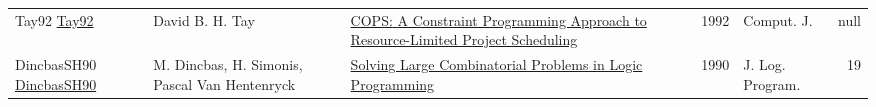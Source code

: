 {\begin{longtable}{p{3cm}p{6cm}p{7cm}rrrp{3cm}r}
Tay92 \href{}{Tay92} & David B. H. Tay & \href{}{{COPS:} {A} Constraint Programming Approach to Resource-Limited Project Scheduling} &  & \cite{Tay92} & 1992 & Comput. J. & null\\
DincbasSH90 \href{https://doi.org/10.1016/0743-1066(90)90052-7}{DincbasSH90} & M. Dincbas, H. Simonis, Pascal Van Hentenryck & \href{articles/DincbasSH90.pdf}{Solving Large Combinatorial Problems in Logic Programming} &  & \cite{DincbasSH90} & 1990 & J. Log. Program. & 19\\
\end{longtable}
}

